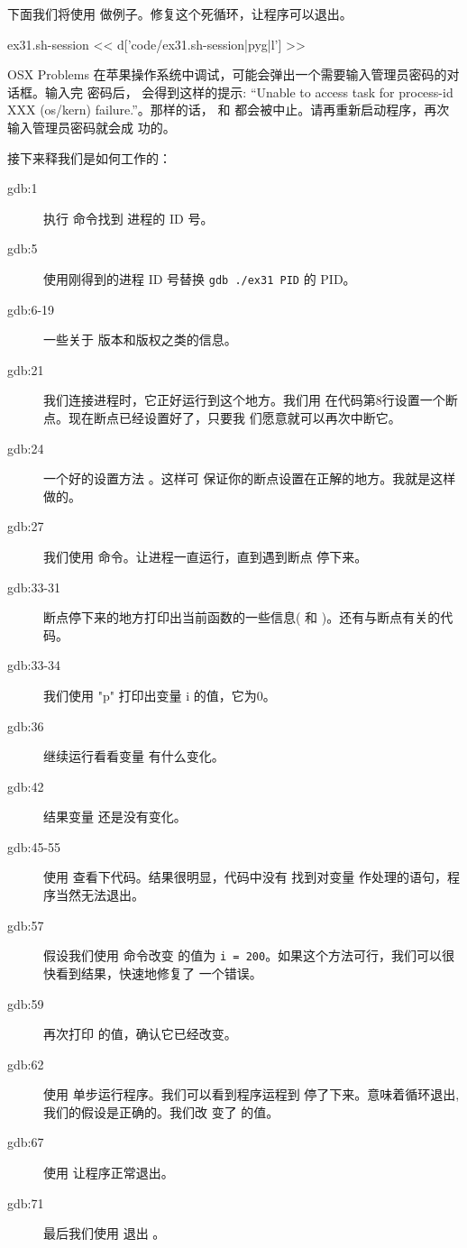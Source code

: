 \begin{enumerate}
下面我们将使用  做例子。修复这个死循环，让程序可以退出。
\begin{code}{ex31.sh-session}
<< d['code/ex31.sh-session|pyg|l'] >>
\end{code}

\begin{aside}{OSX Problems}
在苹果操作系统中调试，可能会弹出一个需要输入管理员密码的对话框。输入完
密码后，  会得到这样的提示: “Unable to access task for
process-id XXX (os/kern) failure.”。那样的话， 和
 都会被中止。请再重新启动程序，再次输入管理员密码就会成
功的。
\end{aside}

接下来释我们是如何工作的：

\begin{description}
\item[gdb:1] 执行  命令找到  进程的 ID 号。
\item[gdb:5] 使用刚得到的进程 ID 号替换 \verb|gdb ./ex31 PID| 的 PID。
\item[gdb:6-19] 一些关于  版本和版权之类的信息。
\item[gdb:21] 我们连接进程时，它正好运行到这个地方。我们用
   在代码第8行设置一个断点。现在断点已经设置好了，只要我
  们愿意就可以再次中断它。
\item[gdb:24] 一个好的设置方法 。这样可
  保证你的断点设置在正解的地方。我就是这样做的。
\item[gdb:27] 我们使用  命令。让进程一直运行，直到遇到断点
  停下来。
\item[gdb:33-31] 断点停下来的地方打印出当前函数的一些信息(
  和 )。还有与断点有关的代码。
\item[gdb:33-34] 我们使用  "p" 打印出变量 i 的值，它为0。
\item[gdb:36] 继续运行看看变量  有什么变化。
\item[gdb:42] 结果变量  还是没有变化。
\item[gdb:45-55] 使用  查看下代码。结果很明显，代码中没有
  找到对变量  作处理的语句，程序当然无法退出。
\item[gdb:57] 假设我们使用  命令改变  的值为
  \verb|i = 200|。如果这个方法可行，我们可以很快看到结果，快速地修复了
  一个错误。
\item[gdb:59] 再次打印  的值，确认它已经改变。
\item[gdb:62] 使用  单步运行程序。我们可以看到程序运程到
   停了下来。意味着循环退出,我们的假设是正确的。我们改
  变了  的值。
\item[gdb:67] 使用 让程序正常退出。
\item[gdb:71] 最后我们使用  退出 。
\end{description}





\end{enumerate}
